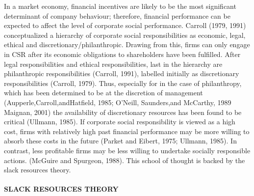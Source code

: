 \documentclass[
]{mitthesis}
\begin{document}
In a market economy, financial incentives are likely to be the most significant determinant of company behaviour; therefore, financial performance can be expected to affect the level of corporate social performance. Carroll (1979, 1991) conceptualized a hierarchy of corporate social responsibilities as economic, legal, ethical and discretionary/philanthropic. Drawing from this, firms can only engage in CSR after its economic obligations to shareholders have been fulfilled. After legal responsibilities and ethical responsibilities, last in the hierarchy are philanthropic responsibilities (Carroll, 1991), labelled initially as discretionary responsibilities (Carroll, 1979). Thus, especially for in the case of philanthropy, which has been determined to be at the discretion of management (Aupperle,Carroll,andHatfield, 1985; O'Neill, Saunders,and McCarthy, 1989 Maignan, 2001) the availability of discretionary resources has been found to be critical (Ullmann, 1985). If corporate social responsibility is viewed as a high cost, firms with relatively high past financial performance may be more willing to absorb these costs in the future (Parket and Eibert, 1975; Ullmann, 1985). In contrast, less profitable firms may be less willing to undertake socially responsible actions. (McGuire and Spurgeon, 1988). This school of thought is backed by the slack resources theory.

\hypertarget{slack-resources-theory}{%
\paragraph{SLACK RESOURCES THEORY}\label{slack-resources-theory}}
\end{document}
